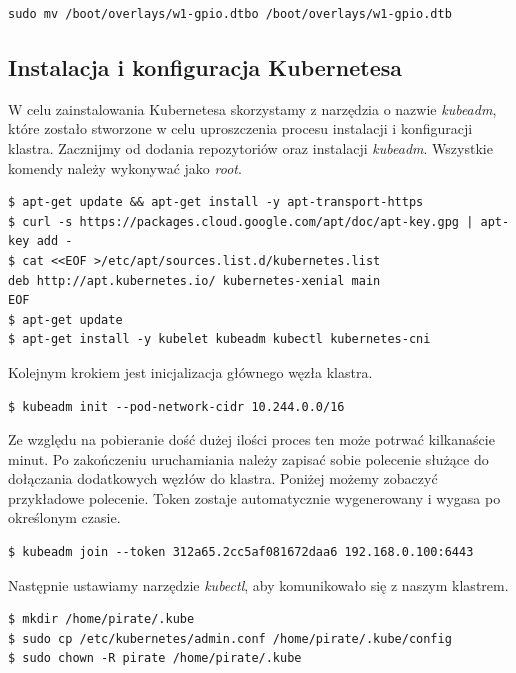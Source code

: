 \documentclass[12pt]{report}
\let\Oldsubsection\subsection
\renewcommand{\subsection}{\FloatBarrier\Oldsubsection}
\begin{document}
{\begin{lstlisting}
sudo mv /boot/overlays/w1-gpio.dtbo	/boot/overlays/w1-gpio.dtb
\end{lstlisting}

\subsection{Instalacja i konfiguracja Kubernetesa} \label{subsect:kubernetes-install}
W celu zainstalowania Kubernetesa skorzystamy z narzędzia o nazwie \textit{kubeadm}, które zostało stworzone w celu uproszczenia procesu instalacji i konfiguracji klastra. Zacznijmy od dodania repozytoriów oraz instalacji \textit{kubeadm}. Wszystkie komendy należy wykonywać jako \textit{root}. \\

\begin{lstlisting}
$ apt-get update && apt-get install -y apt-transport-https
$ curl -s https://packages.cloud.google.com/apt/doc/apt-key.gpg | apt-key add -
$ cat <<EOF >/etc/apt/sources.list.d/kubernetes.list
deb http://apt.kubernetes.io/ kubernetes-xenial main
EOF
$ apt-get update
$ apt-get install -y kubelet kubeadm kubectl kubernetes-cni
\end{lstlisting}

\noindent Kolejnym krokiem jest inicjalizacja głównego węzła klastra. \\

\begin{lstlisting}
$ kubeadm init --pod-network-cidr 10.244.0.0/16
\end{lstlisting}

Ze względu na pobieranie dość dużej ilości proces ten może potrwać kilkanaście minut. Po zakończeniu uruchamiania należy zapisać sobie polecenie służące do dołączania dodatkowych węzłów do klastra. Poniżej możemy zobaczyć przykładowe polecenie. Token zostaje automatycznie wygenerowany i wygasa po określonym czasie.

\begin{lstlisting}
$ kubeadm join --token 312a65.2cc5af081672daa6 192.168.0.100:6443
\end{lstlisting}

Następnie ustawiamy narzędzie \textit{kubectl}, aby komunikowało się z naszym klastrem.

\begin{lstlisting}
$ mkdir /home/pirate/.kube
$ sudo cp /etc/kubernetes/admin.conf /home/pirate/.kube/config
$ sudo chown -R pirate /home/pirate/.kube
\end{lstlisting}

}
\end{document}
